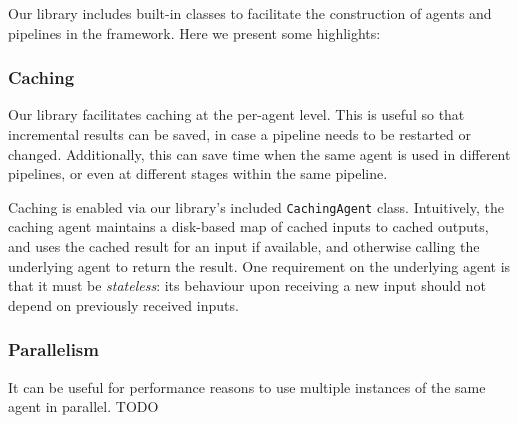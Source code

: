 Our library includes built-in classes to facilitate the construction of agents
and pipelines in the framework. Here we present some highlights:

\subsubsection{Caching}

Our library facilitates caching at the per-agent level. This is useful so that
incremental results can be saved, in case a pipeline needs to be restarted or
changed. Additionally, this can save time when the same agent is used in
different pipelines, or even at different stages within the same pipeline.

Caching is enabled via our library's included \texttt{CachingAgent} class.
Intuitively, the caching agent maintains a disk-based map of cached inputs to
cached outputs, and uses the cached result for an input if available, and
otherwise calling the underlying agent to return the result. One requirement on
the underlying agent is that it must be \emph{stateless}: its behaviour upon
receiving a new input should not depend on previously received inputs.

\subsubsection{Parallelism}

It can be useful for performance reasons to use multiple instances of the same
agent in parallel. TODO
